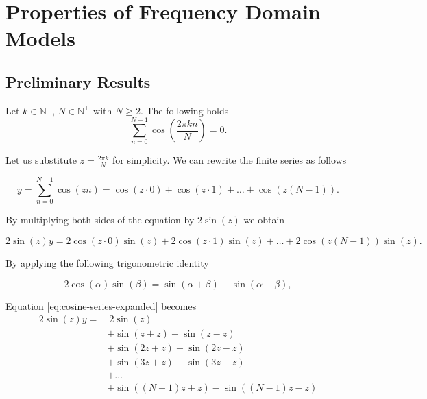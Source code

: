 \section{Properties of Frequency Domain Models}
%
\subsection{Preliminary Results}
%
\begin{lemma} \label{lem:finite-cosine-series-simple}
    Let $k\in \mathbb{N}^+$, $N\in \mathbb{N}^+$ with $N \geq 2$. The following holds
    \begin{equation}
    \sum_{n=0}^{N-1} \cos(\frac{2 \pi k n}{N}) = 0.
    \end{equation}
\end{lemma}
\proof

Let us substitute $z = \frac{2 \pi k}{N}$ for simplicity. We can rewrite the finite series as follows

\begin{equation}
    y = \sum_{n=0}^{N-1} \cos(z n) = \cos(z \cdot 0) + \cos(z \cdot 1) + \dots + \cos(z (N-1)).
\end{equation}

By multiplying both sides of the equation by $2 \sin(z)$ we obtain

\begin{equation}
    \label{eq:cosine-series-expanded}
    2 \sin(z) y = 2 \cos(z \cdot 0) \sin(z) + 2 \cos(z \cdot  1) \sin(z) + \dots + 2 \cos(z (N-1)) \sin(z).
\end{equation}

By applying the following trigonometric identity

\begin{equation}
    2 \cos(\alpha) \sin(\beta) = \sin(\alpha + \beta) - \sin(\alpha - \beta),
\end{equation}

Equation \eqref{eq:cosine-series-expanded} becomes
\begin{equation}
    \begin{aligned}
    2 \sin(z) y =& ~2 \sin(z)\\
    &+ \sin(z + z) - \sin(z - z) \\
    &+ \sin(2z + z) - \sin(2z - z) \\
    &+ \sin(3z + z) - \sin(3z - z) \\
    &+ \dots \\
    &+ \sin((N-1)z + z) - \sin((N-1)z - z) \\
    \end{aligned}
\end{equation}

